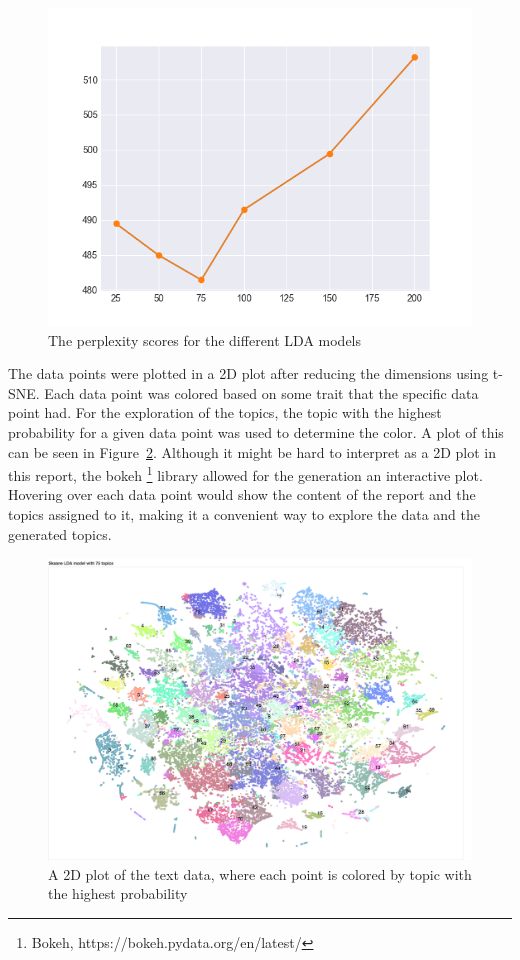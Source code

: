 \begin{figure}
    \centering
    \includegraphics[width=\textwidth]{figures/lda-perplexity.png}
    \caption{The perplexity scores for the different LDA models}
    \label{fig:lda-perplexity}
\end{figure}


The data points were plotted in a 2D plot after reducing the dimensions using t-SNE.
Each data point was colored based on some trait that the specific data point had.
For the exploration of the topics, the topic with the highest probability for a given data point was used to determine the color.
A plot of this can be seen in Figure~\ref{fig:lda-dist}.
Although it might be hard to interpret as a 2D plot in this report, the bokeh \footnote{Bokeh, https://bokeh.pydata.org/en/latest/} library allowed for the generation an interactive plot.
Hovering over each data point would show the content of the report and the topics assigned to it, making it a convenient way to explore the data and the generated topics.

\begin{figure}
    \centering
    \includegraphics[width=\textwidth]{figures/lda-2d-distribution.png}
    \caption{A 2D plot of the text data, where each point is colored by topic with the highest probability}
    \label{fig:lda-dist}
\end{figure}

